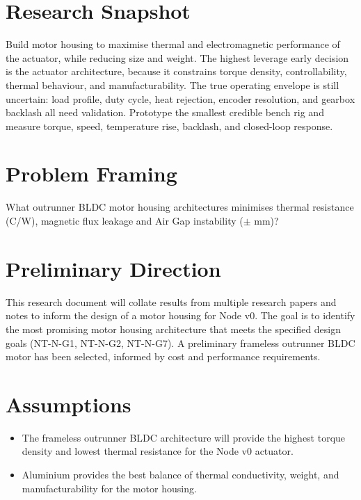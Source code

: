 \documentclass[internal]{../../classes/nervtech-research}
\begin{document}
\maketitle
\tableofcontents
\newpage

\section{Research Snapshot}
\researchsnapshot
{Build motor housing to maximise thermal and electromagnetic performance of the actuator, while reducing size and weight.}
{The highest leverage early decision is the actuator architecture, because it constrains torque density, controllability, thermal behaviour, and manufacturability.}
{The true operating envelope is still uncertain: load profile, duty cycle, heat rejection, encoder resolution, and gearbox backlash all need validation.}
{Prototype the smallest credible bench rig and measure torque, speed, temperature rise, backlash, and closed-loop response.}

\section{Problem Framing}
\begin{researchquestion}
  What outrunner BLDC motor housing architectures minimises thermal resistance (\textdegree C/W), magnetic flux leakage and Air Gap instability ($\pm$ mm)?
\end{researchquestion}

\section{Preliminary Direction}
This research document will collate results from multiple research papers and notes to inform the design of a motor housing for Node v0.
The goal is to identify the most promising motor housing architecture that meets the specified design goals (NT-N-G1, NT-N-G2, NT-N-G7).
A preliminary frameless outrunner BLDC motor has been selected, informed by cost and performance requirements.

\section{Assumptions}
\begin{itemize}
  \item The frameless outrunner BLDC architecture will provide the highest torque density and lowest thermal resistance for the Node v0 actuator.
  \item Aluminium provides the best balance of thermal conductivity, weight, and manufacturability for the motor housing.
\end{itemize}
\end{document}
